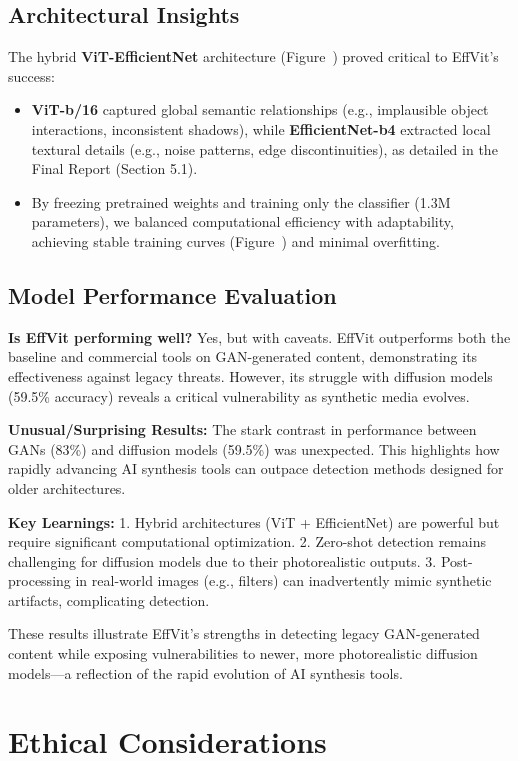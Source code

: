 \documentclass{article} %
\begin{document}
\subsection{Architectural Insights}
The hybrid \textbf{ViT-EfficientNet} architecture (Figure~) proved critical to EffVit's success:
\begin{itemize}
    \item \textbf{ViT-b/16} captured global semantic relationships (e.g., implausible object interactions, inconsistent shadows), while \textbf{EfficientNet-b4} extracted local textural details (e.g., noise patterns, edge discontinuities), as detailed in the Final Report (Section 5.1).  
    \item By freezing pretrained weights and training only the classifier (1.3M parameters), we balanced computational efficiency with adaptability, achieving stable training curves (Figure~) and minimal overfitting.
\end{itemize}

\subsection{Model Performance Evaluation}
\textbf{Is EffVit performing well?}  
Yes, but with caveats. EffVit outperforms both the baseline and commercial tools on GAN-generated content, demonstrating its effectiveness against legacy threats. However, its struggle with diffusion models (59.5\% accuracy) reveals a critical vulnerability as synthetic media evolves.  

\textbf{Unusual/Surprising Results:}  
The stark contrast in performance between GANs (83\%) and diffusion models (59.5\%) was unexpected. This highlights how rapidly advancing AI synthesis tools can outpace detection methods designed for older architectures.  

\textbf{Key Learnings:}  
1. Hybrid architectures (ViT + EfficientNet) are powerful but require significant computational optimization.  
2. Zero-shot detection remains challenging for diffusion models due to their photorealistic outputs.  
3. Post-processing in real-world images (e.g., filters) can inadvertently mimic synthetic artifacts, complicating detection.  

These results illustrate EffVit's strengths in detecting legacy GAN-generated content while exposing vulnerabilities to newer, more photorealistic diffusion models—a reflection of the rapid evolution of AI synthesis tools.

\section{Ethical Considerations}
\end{document}
